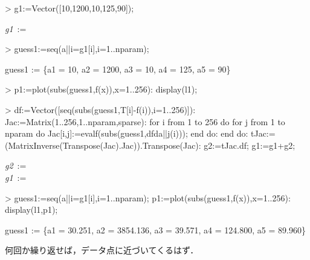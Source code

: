 \begin{MapleInput}
> g1:=Vector([10,1200,10,125,90]);
\end{MapleInput}
\begin{MapleOutput}
{\it g1}\, := \, \left[ \begin {array}{c} 10\\ 1200\\ 10\\ 125\\ 90\end {array} \right] 
\end{MapleOutput}
\begin{MapleInput}
> guess1:={seq(a||i=g1[i],i=1..nparam)};
\end{MapleInput}
\begin{MapleOutput}
guess1 := \{a1 = 10, a2 = 1200, a3 = 10, a4 = 125, a5 = 90\}
\end{MapleOutput}

\begin{MapleInput}
> p1:=plot(subs(guess1,f(x)),x=1..256): 
  display(l1);
\end{MapleInput}

\begin{MapleInput}
> df:=Vector([seq(subs(guess1,T[i]-f(i)),i=1..256)]):
  Jac:=Matrix(1..256,1..nparam,sparse):
  for i from 1 to 256 do 
    for j from 1 to nparam do
      Jac[i,j]:=evalf(subs(guess1,dfda||j(i))); 
    end do:
  end do:
  tJac:=(MatrixInverse(Transpose(Jac).Jac)).Transpose(Jac):
  g2:=tJac.df; g1:=g1+g2;
\end{MapleInput}
\begin{MapleOutputGather}
{\it g2}\, := \, \left[ \begin {array}{c} - 0.390553882992161205\\  1584.55290636967129\\  24.9577909601538366\\ - 0.0472041829705451138\\ - 0.00719532042503852940\end {array} \right]  \notag \\
{\it g1}\, := \, \left[ \begin {array}{c}  13.6348019182603064\\  29567.3667677707381\\  410.545681677467769\\  128.512734548828887\\  90.9223109918718678\end {array} \right] \notag
\end{MapleOutputGather}

\begin{MapleInput}
> guess1:={seq(a||i=g1[i],i=1..nparam)};
  p1:=plot(subs(guess1,f(x)),x=1..256):
  display(l1,p1);
\end{MapleInput}
\begin{MapleOutput}
guess1 := \{a1 = 30.251, a2 = 3854.136, a3 = 39.571, a4 = 124.800, a5 = 89.960\}
\end{MapleOutput}
何回か繰り返せば，データ点に近づいてくるはず．
